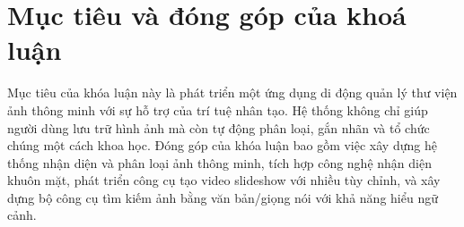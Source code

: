 \section{Mục tiêu và đóng góp của khoá luận}

Mục tiêu của khóa luận này là phát triển một ứng dụng di động quản lý thư viện ảnh thông minh với sự hỗ trợ của trí tuệ nhân tạo. Hệ thống không chỉ giúp người dùng lưu trữ hình ảnh mà còn tự động phân loại, gắn nhãn và tổ chức chúng một cách khoa học. Đóng góp của khóa luận bao gồm việc xây dựng hệ thống nhận diện và phân loại ảnh thông minh, tích hợp công nghệ nhận diện khuôn mặt, phát triển công cụ tạo video slideshow với nhiều tùy chỉnh, và xây dựng bộ công cụ tìm kiếm ảnh bằng văn bản/giọng nói với khả năng hiểu ngữ cảnh. 